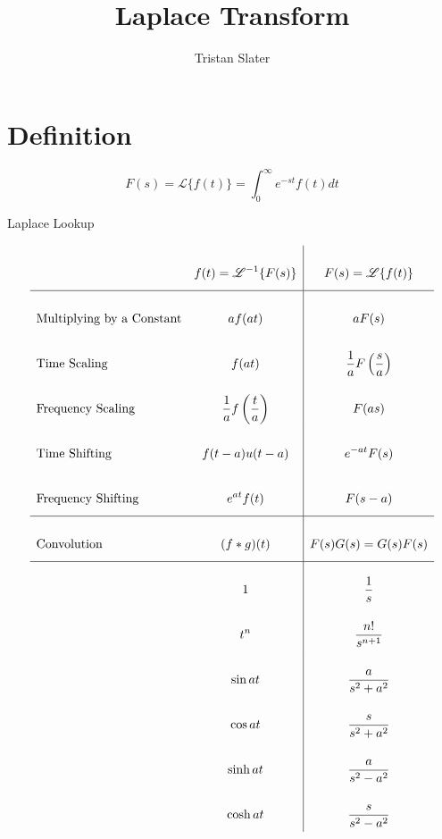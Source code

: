 \documentclass{article}
\title{Laplace Transform}
\author{Tristan Slater}
\begin{document}
    \maketitle
    
    \section{Definition}

    \begin{equation}
        F(s) = \mathscr{L}\{f(t)\} = \int_0^\infty{e^{-st} f(t) dt}
    \end{equation}

    \begin{table}[h]
        \centering
        \caption{Laplace Lookup}
        $$\def\arraystretch{3}
        \begin{array}{>$l<$>{\displaystyle}c|>{\displaystyle}c}
            & f(t) = \mathscr{L}^{-1}\{F(s)\} & F(s) = \mathscr{L}\{f(t)\} \\
            \hline
            Multiplying by a Constant & af(at) & aF(s) \\
            Time Scaling & f(at) & \frac{1}{a}F\left(\frac{s}{a}\right) \\
            Frequency Scaling & \frac{1}{a}f\left(\frac{t}{a}\right) & F(as) \\
            Time Shifting & f(t - a)u(t - a) & e^{-at}F(s) \\
            Frequency Shifting & e^{at} f(t) & F(s - a) \\
            \hline
            Convolution & (f * g)(t) & F(s)G(s) = G(s)F(s) \\
            \hline
            & 1 & \frac{1}{s} \\
            & t^n & \frac{n!}{s^{n + 1}} \\
            & \sin{at} & \frac{a}{s^2 + a^2} \\
            & \cos{at} & \frac{s}{s^2 + a^2} \\
            & \sinh{at} & \frac{a}{s^2 - a^2} \\
            & \cosh{at} & \frac{s}{s^2 - a^2} \\
        \end{array}$$
    \end{table}
\end{document}
